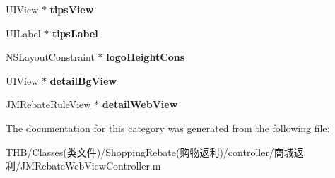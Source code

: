 \begin{DoxyCompactItemize}
U\+I\+View $\ast$ {\bfseries tips\+View}
\item 
\mbox{\label{category_j_m_rebate_web_view_controller_07_08_abacf5e594e3c6df162ff646e17812dcf}} 
U\+I\+Label $\ast$ {\bfseries tips\+Label}
\item 
\mbox{\label{category_j_m_rebate_web_view_controller_07_08_a750bef9c8fd57a335baa9f7e6f5211b3}} 
N\+S\+Layout\+Constraint $\ast$ {\bfseries logo\+Height\+Cons}
\item 
\mbox{\label{category_j_m_rebate_web_view_controller_07_08_ae3c833c47e28e95e3d7e44dc24e2b76b}} 
U\+I\+View $\ast$ {\bfseries detail\+Bg\+View}
\item 
\mbox{\label{category_j_m_rebate_web_view_controller_07_08_a540d8bf2e0266ddd516a832268356a4a}} 
\mbox{\hyperlink{interface_j_m_rebate_rule_view}{J\+M\+Rebate\+Rule\+View}} $\ast$ {\bfseries detail\+Web\+View}
\end{DoxyCompactItemize}


The documentation for this category was generated from the following file\+:\begin{DoxyCompactItemize}
\item 
T\+H\+B/\+Classes(类文件)/\+Shopping\+Rebate(购物返利)/controller/商城返利/J\+M\+Rebate\+Web\+View\+Controller.\+m\end{DoxyCompactItemize}
